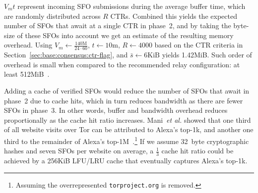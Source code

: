 $V_mt$ represent incoming SFO submissions during the average buffer time, which
are randomly distributed across $R$ CTRs.  Combined this yields the expected
number of SFOs that await at a single CTR in phase~2, and by taking the
byte-size of these SFOs into account we get an estimate of the resulting memory
overhead.  Using
	$V_m \gets \frac{140\textrm{M}}{24\cdot60}$,
	$t \gets 10$m,
	$R \gets 4000$ based on the CTR criteria in
		Section~\ref{sec:base:consensus:ctr-flag}, and
	$\bar{s} \gets 6\textrm{KiB}$
yields 1.42MiB.  Such order of overhead is small when compared to the
recommended relay configuration:
	at least 512MiB~\cite{relay-config}.

Adding a cache of verified SFOs would reduce the number of SFOs that await in
phase~2 due to cache hits, which in turn reduces bandwidth as there are fewer
SFOs in phase~3.  In other words, buffer and bandwidth overhead reduces
proportionally as the cache hit ratio increases.  Mani~\emph{et al.} showed that
one third of all website visits over Tor can be attributed to Alexa's top-1k,
and another one third to the remainder of Alexa's top-1M~\cite{mani}.\footnote{%
	Assuming the overrepresented \texttt{torproject.org} is removed.
} If we assume 32~byte cryptographic hashes and seven SFOs per website on
average, a $\frac{1}{3}$ cache hit ratio could be achieved by a 256KiB LFU/LRU
cache that eventually captures Alexa's top-1k.
